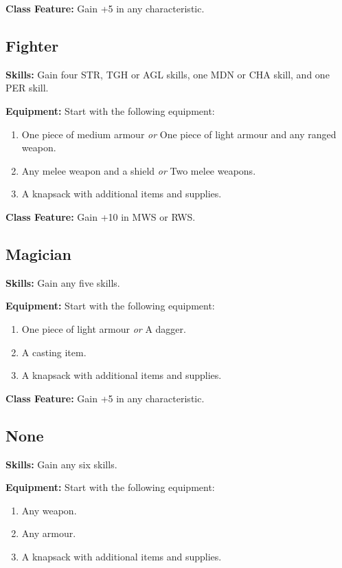 \documentclass[]{article}
\providecommand{\tightlist}{%
  \setlength{\itemsep}{0pt}\setlength{\parskip}{0pt}}
\begin{document}
\textbf{Class Feature:} Gain +5 in any characteristic.

\subsection{Fighter}\label{fighter}

\textbf{Skills:} Gain four STR, TGH or AGL skills, one MDN or CHA skill,
and one PER skill.

\textbf{Equipment:} Start with the following equipment:

\begin{enumerate}
\def\labelenumi{\arabic{enumi}.}
\tightlist
\item
  One piece of medium armour \emph{or} One piece of light armour and any
  ranged weapon.
\item
  Any melee weapon and a shield \emph{or} Two melee weapons.
\item
  A knapsack with additional items and supplies.
\end{enumerate}

\textbf{Class Feature:} Gain +10 in MWS or RWS.

\subsection{Magician}\label{magician}

\textbf{Skills:} Gain any five skills.

\textbf{Equipment:} Start with the following equipment:

\begin{enumerate}
\def\labelenumi{\arabic{enumi}.}
\tightlist
\item
  One piece of light armour \emph{or} A dagger.
\item
  A casting item.
\item
  A knapsack with additional items and supplies.
\end{enumerate}

\textbf{Class Feature:} Gain +5 in any characteristic.

\subsection{None}\label{none}

\textbf{Skills:} Gain any six skills.

\textbf{Equipment:} Start with the following equipment:

\begin{enumerate}
\def\labelenumi{\arabic{enumi}.}
\tightlist
\item
  Any weapon.
\item
  Any armour.
\item
  A knapsack with additional items and supplies.
\end{enumerate}
\end{document}

